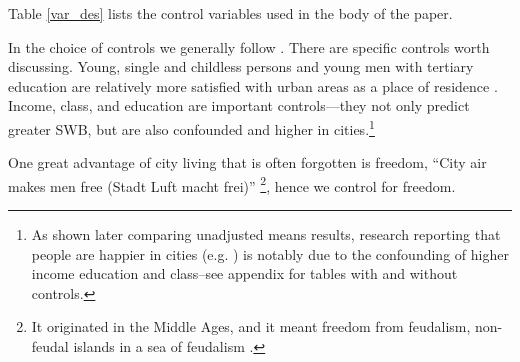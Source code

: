 \documentclass[10pt, letterpaper]{article}
\begin{document}



Table \ref{var_des} lists the control variables used in the body of the
paper.%


 
In the choice of controls we generally follow \citep{aok20}. There are specific
controls worth discussing.
%
 Young, single and childless persons and young men with tertiary education are
 relatively more satisfied with urban areas as a place of residence \citep{anon-regional-studies-19}.
Income, class,  and education are important controls---they not only predict greater
 SWB, but are also confounded and higher in cities.\footnote{As shown later comparing unadjusted means results, research reporting that people are happier in cities (e.g. \citep{burger20}) is notably due to the confounding of higher income education and class--see appendix for tables with and without controls.} 

One great advantage of city living that is often forgotten is freedom, ``City
 air makes men free (Stadt Luft macht frei)'' \citet[p. 12]{park84}\footnote{It
   originated in the Middle Ages, and it meant freedom from feudalism,
   non-feudal islands in a sea of feudalism \citep{harvey12}.}, hence we control
 for freedom. 
 
\end{document}
